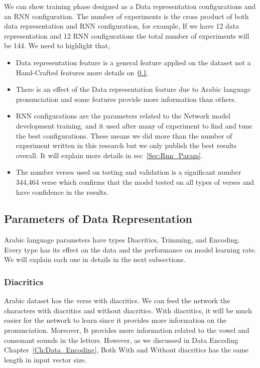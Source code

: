 We can show training phase designed as a Data representation configurations and an RNN configuration. The number of experiments is the cross product of both data representation and RNN configuration, for example, If we have 12 data representation and 12 RNN configurations the total number of experiments will be 144. We need to highlight that,

\begin{itemize}
  \item Data representation feature is a general feature applied on the dataset not a Hand-Crafted features more details on~\ref{Sec:Data_Rep_Param}.
  \item There is an effect of the Data representation feature due to Arabic language pronunciation and some features provide more information than others.
  \item RNN configurations are the parameters related to the Network model development training, and it used after many of experiment to find and tune the best configurations. These means we did more than the number of experiment written in this research but we only publish the best results overall. It will explain more details in sec~\ref{Sec:Rnn_Param}.
  \item The number verses used on testing and validation is a significant number 344,464 verse which confirms that the model tested on all types of verses and have confidence in the results.

\end{itemize}

\subsection{Parameters of Data Representation}\label{Sec:Data_Rep_Param}

Arabic language parameters have types Diacritics, Trimming, and Encoding. Every type has its effect on the data and the performance on model learning rate. We will explain each one in details in the next subsections.

\subsubsection{Diacritics}

Arabic dataset has the verse with diacritics. We can feed the network the characters with diacritics and without diacritics. With diacritics, it will be much easier for the network to learn since it provides more information on the pronunciation. Moreover, It provides more information related to the vowel and consonant sounds in the letters. However, as we discussed in Data Encoding Chapter~\ref{Ch:Data_Encoding}, Both With and Without diacritics has the same length in input vector size.

